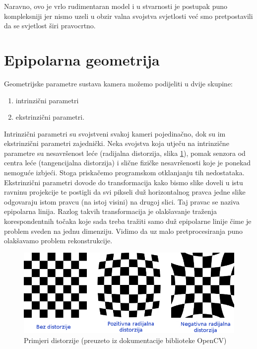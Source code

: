 \documentclass[utf8, zavrsni, numeric]{fer}
\begin{document}
Naravno, ovo je vrlo rudimentaran model i u stvarnosti je postupak puno kompleksniji jer nismo
uzeli u obzir valna svojstva svjetlosti već smo pretpostavili da se svjetlost širi pravocrtno.

\section{Epipolarna geometrija}

Geometrijske parametre sustava kamera možemo podijeliti u dvije skupine:
\begin{enumerate}
  \item intrinzični parametri
  \item ekstrinzični parametri.
\end{enumerate}

Intrinzični parametri su svojstveni svakoj kameri pojedinačno, dok su im ekstrinzični parametri zajednički. Neka svojstva koja utječu na intrinzične parametre su nesavršenost leće (radijalna distorzija, slika \ref{fig:primjeri-distorzije}), pomak senzora
od centra leće (tangencijalna distorzija) i slične fizičke nesavršenosti koje je ponekad nemoguće izbjeći. Stoga priskačemo programskom otklanjanju tih nedostataka.
Ekstrinzični parametri dovode do transformacija kako bismo slike doveli u istu ravninu projekcije te postigli da svi pikseli duž horizontalnog pravca jedne slike odgovaraju istom pravcu (na istoj visini) na drugoj slici.
Taj pravac se naziva epipolarna linija. Razlog takvih transformacija je olakšavanje traženja korespondentnih točaka koje sada treba tražiti samo duž epipolarne linije čime je problem sveden na jednu dimenziju. Vidimo da uz malo pretprocesiranja puno olakšavamo problem rekonstrukcije.

\begin{figure}[htb]
  \centering
  \includegraphics[width=13cm]{img/distortion_examples.png}
  \caption{Primjeri distorzije (preuzeto iz dokumentacije biblioteke OpenCV)}
  \label{fig:primjeri-distorzije}
\end{figure}
\end{document}
